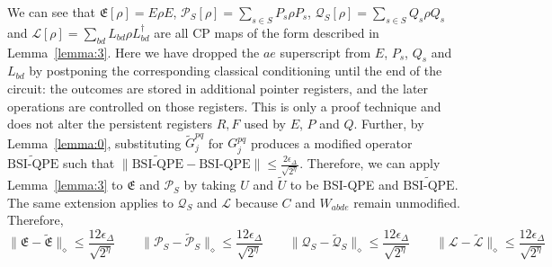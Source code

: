 \documentclass[aps,floatfix,10pt,amssymb,amsfont,amsmath,superscriptaddress,float,nofootinbib,longbibliography,nobalancelastpage,twocolumn]{revtex4-2}
\begin{document}
\begin{widetext}
We can see that $\mathfrak{E}[\rho] =  E \rho E$, $\mathcal{P}_S[\rho] = \sum_{s\in S} P_s \rho P_s$, $\mathcal{Q}_S[\rho] = \sum_{s\in S} Q_s \rho Q_s$ and $\mathcal{L}[\rho] = \sum_{bd} L_{bd} \rho L^{\dagger}_{bd}$ are all CP maps of the form described in Lemma~\ref{lemma:3}. Here we have dropped the $ae$ superscript from $E$, $P_s$, $Q_s$ and $L_{bd}$ by postponing the corresponding classical conditioning until the end of the circuit: the outcomes are stored in additional pointer registers, and the later operations are controlled on those registers. This is only a proof technique and does not alter the persistent registers $R, F$ used by $E$, $P$ and $Q$. Further, by Lemma~\ref{lemma:0}, substituting $\tilde G^{pq}_j$ for $G^{pq}_j$ produces a modified operator $\widetilde{\text{BSI-QPE}}$ such that $\|\widetilde{\text{BSI-QPE}}- \text{BSI-QPE}\| \leq \frac{2\epsilon_{\Delta}}{\sqrt{2^{\eta}}}$. Therefore, we can apply Lemma~\ref{lemma:3} to $\mathfrak{E}$ and $\mathcal{P}_S$ by taking $U$ and $\tilde U$ to be BSI-QPE and $\widetilde{\text{BSI-QPE}}$. The same extension applies to $\mathcal{Q}_S$ and $\mathcal{L}$ because $C$ and $W_{abde}$ remain unmodified. Therefore,
\begin{equation}
    \|\mathfrak{E} - \tilde{\mathfrak{E}}\|_{\diamond} \leq \frac{12\epsilon_{\Delta}}{\sqrt{2^{\eta}}} \qquad\|\mathcal{P}_S - \tilde{\mathcal{P}}_S\|_{\diamond} \leq \frac{12\epsilon_{\Delta}}{\sqrt{2^{\eta}}} \qquad\|\mathcal{Q}_S - \tilde{\mathcal{Q}}_S\|_{\diamond} \leq \frac{12\epsilon_{\Delta}}{\sqrt{2^{\eta}}}  \qquad\|\mathcal{L} - \tilde{\mathcal{L}}\|_{\diamond} \leq \frac{12\epsilon_{\Delta}}{\sqrt{2^{\eta}}} 
\end{equation}
\end{widetext}
\end{document}
